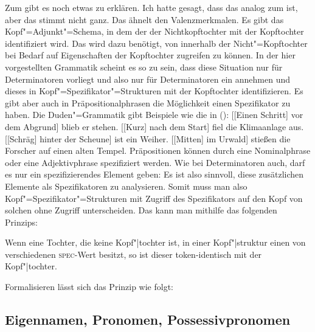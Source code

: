 \noindent
Zum \specw gibt es noch etwas zu erklären. Ich hatte gesagt, dass das \specm analog zum \modm ist,
aber das stimmt nicht ganz. Das \modm ähnelt den Valenzmerkmalen. Es gibt das Kopf"=Adjunkt"=Schema,
in dem der \modw der Nichtkopftochter mit der Kopftochter identifiziert wird. Das \specm wird dazu
benötigt, von innerhalb der Nicht"=Kopftochter bei Bedarf auf Eigenschaften der Kopftochter
zugreifen zu können. In der hier vorgestellten Grammatik scheint es so zu sein, dass diese Situation nur
für Determinatoren vorliegt und also nur für Determinatoren ein \specm annehmen und dieses in
Kopf"=Spezifikator"=Strukturen mit der Kopftochter identifizieren. Es gibt aber auch in
Präpositionalphrasen die Möglichkeit einen Spezifikator zu haben. Die Duden"=Grammatik \citeyearpar[\S 1300]{Duden2005} gibt Beispiele wie die in ():
\eal
\ex {}[[Einen Schritt] vor dem Abgrund] blieb er stehen.\label{Beispiel-Schritt-vor-dem-Abgrund}
\ex {}[[Kurz] nach dem Start] fiel die Klimaanlage aus.
\ex {}[[Schräg] hinter der Scheune] ist ein Weiher.
\ex {}[[Mitten] im Urwald] stießen die Forscher auf einen alten Tempel.
\zl
Präpositionen können durch eine Nominalphrase oder eine Adjektivphrase spezifiziert werden. Wie bei
Determinatoren auch, darf es nur ein spezifizierendes Element geben:
\eal
{}
\zl
Es ist also sinnvoll, diese zusätzlichen Elemente als Spezifikatoren zu analysieren.
Somit muss man also Kopf"=Spezifikator"=Strukturen mit Zugriff des Spezifikators auf den Kopf von
solchen ohne Zugriff unterscheiden. Das kann man mithilfe das folgenden Prinzips:

\begin{prinzip-break} 
\label{prinzip-spec}
Wenn eine Tochter, die keine Kopf"|tochter ist, in einer Kopf"|struktur
einen von  verschiedenen \textsc{spec}-Wert besitzt, so ist dieser token-identisch mit
der Kopf"|tochter.
\end{prinzip-break}
Formalisieren lässt sich das Prinzip wie folgt:
\ea
{} \impl
{}
\z

\subsection{Eigennamen, Pronomen, Possessivpronomen}


